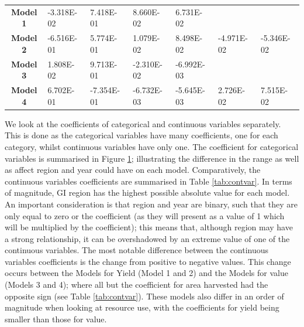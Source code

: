 \documentclass[review,12pt,authoryear]{elsarticle}
\begin{document}
\begin{linenumbers}
\begin{table}[]
{\begin{tabular}{@{}cllllll@{}}
  \textbf{Model 1} & -3.318E-02 & 7.418E-01 & 8.660E-02 & 6.731E-02 &  &  \\
  \textbf{Model 2} & -6.516E-01 & 5.774E-01 & 1.079E-02 & 8.498E-02 & -4.971E-02 & -5.346E-02 \\
  \textbf{Model 3} & 1.808E-02 & 9.713E-01 & -2.310E-02 & -6.992E-03 &  &  \\
  \textbf{Model 4} & 6.702E-01 & -7.354E-01 & -6.732E-03 & -5.645E-03 & 2.726E-02 & 7.515E-02 \\ \bottomrule
\end{tabular}}
\end{table}
We look at the coefficients of categorical and continuous variables separately. This is done as the categorical variables have many coefficients, one for each category, whilst continuous variables have only one. The coefficient for categorical variables is summarised in Figure \ref{fig:violin}; illustrating the difference in the range as well as affect region and year could have on each model. Comparatively, the continuous variables coefficients are summarised in Table \ref{tab:contvar}.
In terms of magnitude, GI region has the highest possible absolute value for each model. An important consideration is that region and year are binary, such that they are only equal to zero or the coefficient (as they will present as a value of 1 which will be multiplied by the coefficient); this means that, although region may have a strong relationship, it can be overshadowed by an extreme value of one of the continuous variables. The most notable difference between the continuous variables coefficients is the change from positive to negative values. This change occurs between the Models for Yield (Model 1 and 2) and the Models for value (Models 3 and 4); where all but the coefficient for area harvested had the opposite sign (see Table \ref{tab:contvar}). These models also differ in an order of magnitude when looking at resource use, with the coefficients for yield being smaller than those for value. 
%
%
%
%
\begin{figure}\label{fig:violin}

\end{figure}
\end{linenumbers}
\end{document}

